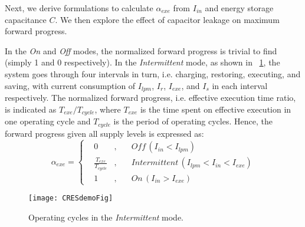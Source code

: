 Next, we derive formulations to calculate $\alpha_{exe}$ from $I_{in}$ and energy storage capacitance $C$. We then explore the effect of capacitor leakage on maximum forward progress. 

In the \textit{On} and \textit{Off} modes, the normalized forward progress is trivial to find (simply 1 and 0 respectively). In the \textit{Intermittent} mode,  as shown in \figurename{~\ref{fig:operatingCycle}}, the system goes through four intervals in turn, i.e. charging, restoring, executing, and saving, with current consumption of $I_{lpm}$, $I_{r}$, $I_{exe}$, and $I_{s}$ in each interval respectively. The normalized forward progress, i.e. effective execution time ratio, is indicated as $T_{exe} / T_{cycle}$, where $T_{exe}$ is the time spent on effective execution in one operating cycle and $T_{cycle}$ is the period of operating cycles. Hence, the forward progress given all supply levels is expressed as:
\begin{equation}
    \alpha_{exe} = \left\{
    \begin{aligned}
        & 0 & , & \quad \textit{Off} \, (I_{in} < I_{lpm}) \\
        & \frac{T_{exe}}{T_{cycle}} & , & \quad \textit{Intermittent} \, (I_{lpm} < I_{in} < I_{exe}) \\
        & 1 & , & \quad \textit{On} \, (I_{in} > I_{exe})
    \end{aligned}
    \right.
    \label{eq:feff}
\end{equation}

\begin{figure}[!t]
  \centering
  \texttt{[image: CRESdemoFig]}
  \caption{Operating cycles in the \textit{Intermittent} mode. }
  \label{fig:operatingCycle}
\end{figure}


